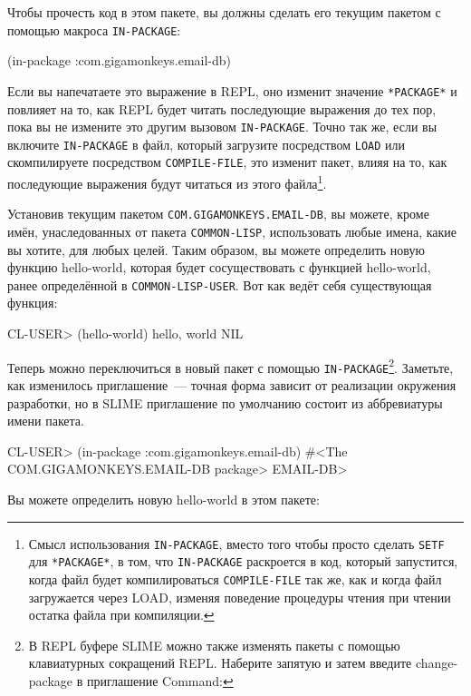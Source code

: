 Чтобы прочесть код в этом пакете, вы должны сделать его текущим пакетом с помощью макроса
\lstinline{IN-PACKAGE}:

\begin{myverb}
(in-package :com.gigamonkeys.email-db)
\end{myverb}

Если вы напечатаете это выражение в REPL, оно изменит значение \lstinline{*PACKAGE*} и повлияет
на то, как REPL будет читать последующие выражения до тех пор, пока вы не измените это
другим вызовом \lstinline{IN-PACKAGE}. Точно так же, если вы включите \lstinline{IN-PACKAGE} в файл,
который загрузите посредством \lstinline{LOAD} или скомпилируете посредством
\lstinline{COMPILE-FILE}, это изменит пакет, влияя на то, как последующие выражения будут
читаться из этого файла\footnote{Смысл использования \lstinline{IN-PACKAGE}, вместо того
  чтобы просто сделать \lstinline{SETF} для \lstinline{*PACKAGE*}, в том, что \lstinline{IN-PACKAGE}
  раскроется в код, который запустится, когда файл будет компилироваться
  \lstinline{COMPILE-FILE} так же, как и когда файл загружается через LOAD, изменяя поведение
  процедуры чтения при чтении остатка файла при компиляции.}.

Установив текущим пакетом \lstinline{COM.GIGAMONKEYS.EMAIL-DB}, вы можете, кроме имён,
унаследованных от пакета \lstinline{COMMON-LISP}, использовать любые имена, какие вы хотите,
для любых целей. Таким образом, вы можете определить новую функцию hello-world, которая
будет сосуществовать с функцией hello-world, ранее определённой в
\lstinline{COMMON-LISP-USER}. Вот как ведёт себя существующая функция:

\begin{myverb}
CL-USER> (hello-world)
hello, world
NIL
\end{myverb}

Теперь можно переключиться в новый пакет с помощью \lstinline{IN-PACKAGE}\footnote{В REPL
буфере SLIME можно также изменять пакеты с помощью клавиатурных сокращений REPL. Наберите
запятую и затем введите change-package в приглашение Command:}. Заметьте, как изменилось
приглашение~--- точная форма зависит от реализации окружения разработки, но в SLIME
приглашение по умолчанию состоит из аббревиатуры имени пакета.

\begin{myverb}
CL-USER> (in-package :com.gigamonkeys.email-db)
#<The COM.GIGAMONKEYS.EMAIL-DB package>
EMAIL-DB> 
\end{myverb}

Вы можете определить новую hello-world в этом пакете:

